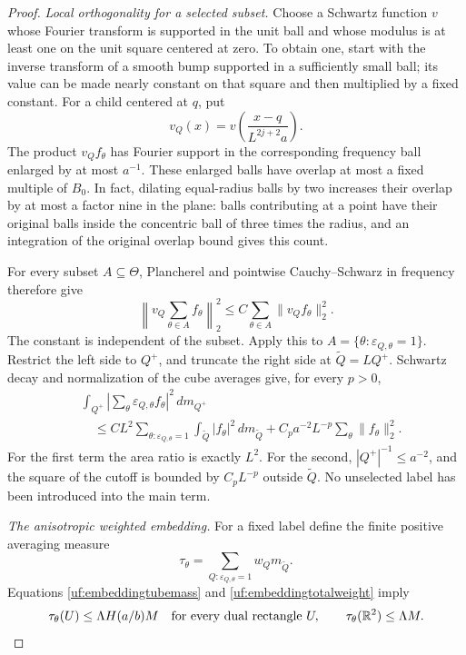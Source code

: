 \begin{proof}
\emph{Local orthogonality for a selected subset.}
Choose a Schwartz function \(v\) whose Fourier transform is supported
in the unit ball and whose modulus is at least one on the unit square
centered at zero. To obtain one, start with the inverse transform of
a smooth bump supported in a sufficiently small ball; its value can
be made nearly constant on that square and then multiplied by a fixed
constant. For a child centered at \(q\), put
$$
 v_Q(x)=v\left(\frac{x-q}{L^{2j+2}a}\right).
$$
The product \(v_Qf_\theta\) has Fourier support in the corresponding
frequency ball enlarged by at most \(a^{-1}\). These enlarged balls
have overlap at most a fixed multiple of \(B_0\). In fact, dilating
equal-radius balls by two increases their overlap by at most a factor
nine in the plane: balls contributing at a point have their original
balls inside the concentric ball of three times the radius, and an
integration of the original overlap bound gives this count.

For every subset \(A\subseteq\Theta\), Plancherel and pointwise
Cauchy--Schwarz in frequency therefore give
\begin{equation}\label{uf:embeddingsubset}
 \left\|v_Q\sum_{\theta\in A}f_\theta\right\|_2^2
 \leq C\sum_{\theta\in A}\|v_Qf_\theta\|_2^2.
\end{equation}
The constant is independent of the subset. Apply this to
\(A=\{\theta:\varepsilon_{Q,\theta}=1\}\). Restrict the left side
to \(Q^+\), and truncate the right side at \(\widetilde Q=LQ^+\).
Schwartz decay and normalization of the cube averages give, for every
\(p>0\),
\begin{align}\label{uf:embeddinglocalorthog}
 &\int_{Q^+}\left|\sum_\theta
               \varepsilon_{Q,\theta}f_\theta\right|^2\,dm_{Q^+}
 \\
 &\quad\leq C L^2
        \sum_{\theta:\varepsilon_{Q,\theta}=1}
             \int_{\widetilde Q}|f_\theta|^2\,dm_{\widetilde Q}
       +C_p a^{-2}L^{-p}\sum_\theta\|f_\theta\|_2^2.\nonumber
\end{align}
For the first term the area ratio is exactly \(L^2\). For the second,
\(|Q^+|^{-1}\leq a^{-2}\), and the square of the cutoff is bounded
by \(C_pL^{-p}\) outside \(\widetilde Q\). No unselected label
has been introduced into the main term.

\emph{The anisotropic weighted embedding.}
For a fixed label define the finite positive averaging measure
$$
 \tau_\theta=
 \sum_{Q:\varepsilon_{Q,\theta}=1}w_Qm_{\widetilde Q}.
$$
Equations \eqref{uf:embeddingtubemass} and
\eqref{uf:embeddingtotalweight} imply
\begin{equation}\label{uf:embeddingtaumass}
 \tau_\theta(U)\leq\Lambda H(a/b)M
 \quad\text{for every dual rectangle }U,
 \qquad \tau_\theta(\mathbb R^2)\leq\Lambda M.
\end{equation}


\end{proof}
